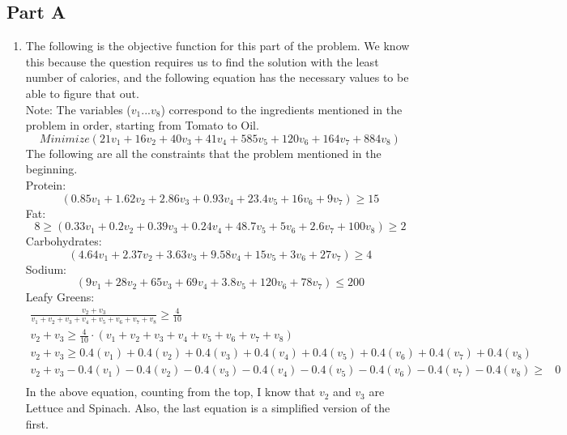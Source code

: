 \documentclass[11pt,letterpaper]{article}
\begin{document}
\subsection*{Part A}
\begin{enumerate}
	\item The following is the objective function for this part of the problem. We know this because the question requires us to find the solution with the least number of calories, and the following equation has the necessary values to be able to figure that out. \\
	Note: The variables ($v_1 ... v_8$) correspond to the ingredients mentioned in the problem in order, starting from Tomato to Oil.
	\begin{equation*}
	Minimize (21v_1 + 16v_2 + 40v_3 + 41v_4 + 585v_5 + 120v_6 + 164v_7 + 884v_8)
	\end{equation*}
	The following are all the constraints that the problem mentioned in the beginning.\\
	Protein:
	\begin{equation*}
	(0.85v_1+1.62v_2+2.86v_3+0.93v_4+23.4v_5+16v_6+9v_7) \geq 15
	\end{equation*}
	Fat:
	\begin{equation*}
	8 \geq (0.33v_1+0.2v_2+0.39v_3+0.24v_4+48.7v_5+5v_6+2.6v_7+100v_8) \geq 2
	\end{equation*}
	Carbohydrates:
	\begin{equation*}
	(4.64v_1+2.37v_2+3.63v_3+9.58v_4+15v_5+3v_6+27v_7) \geq 4
	\end{equation*}
	Sodium:
	\begin{equation*}
	(9v_1+28v_2+65v_3+69v_4+3.8v_5+120v_6+78v_7) \leq 200
	\end{equation*}
	Leafy Greens:
	\begin{align*}
	\frac{v_2 + v_3}{v_1 + v_2 + v_3 + v_4 + v_5 + v_6 + v_7 + v_8} \geq \frac{4}{10} \\
	v_2 + v_3 \geq \frac{4}{10} \cdot \left( v_1 + v_2 + v_3 + v_4 + v_5 + v_6 + v_7 + v_8\right) \\
	v_2 + v_3 \geq 0.4(v_1) + 0.4(v_2) + 0.4(v_3) + 0.4(v_4) + 0.4(v_5) + 0.4(v_6) + 0.4(v_7) + 0.4(v_8) \\
	v_2 + v_3 - 0.4(v_1) - 0.4(v_2) - 0.4(v_3) - 0.4(v_4) - 0.4(v_5) - 0.4(v_6) - 0.4(v_7) - 0.4(v_8) \geq &0 \\
	\end{align*}
	In the above equation, counting from the top, I know that $v_2$ and $v_3$ are Lettuce and Spinach. Also, the last equation is a simplified version of the first.
	

\end{enumerate}
\end{document}
